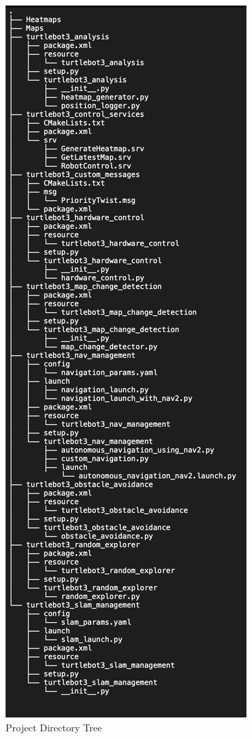\documentclass[%
paper=A4,               %
twoside=true,           %
openright,              %
11pt,                   %
bibliography=totoc,     %
titlepage=on,           %
DIV=12,                 %
BCOR=1.5cm,             %
parskip=half,            %
final
]{scrreprt}
\begin{document}
	\begin{figure}[H]
		\centering
		\includegraphics[height=1.0\textheight]{Graphics/tree}
		\caption{Project Directory Tree}
		\label{fig:fig16}
	\end{figure}
	
\end{document}
